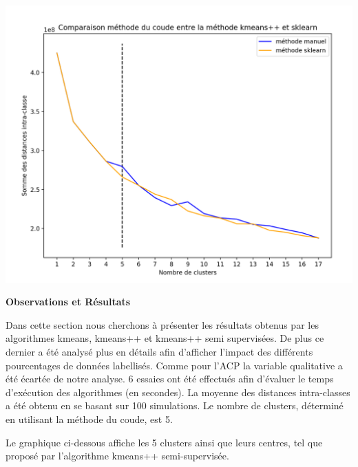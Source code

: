 \documentclass[ ]{article}
\begin{document}
\begin{center}
\includegraphics[scale=0.50]{Comparison_elbow2.png}
\end{center}

\vspace{5 mm}
\noindent
\begin{large}
\textbf{Observations et Résultats}
\end{large}

\noindent
Dans cette section nous cherchons à présenter les résultats obtenus par les algorithmes kmeans, kmeans++ et kmeans++ semi supervisées. De plus ce dernier a été analysé plus en détails afin d'afficher l'impact des différents pourcentages de données labellisés. Comme pour l'ACP la variable qualitative a été écartée de notre analyse.
6 essaies ont été effectués afin d'évaluer le temps d'exécution des algorithmes (en secondes). La moyenne des distances intra-classes a été obtenu en se basant sur 100 simulations. Le nombre de clusters, déterminé en utilisant la méthode du coude, est 5.

\noindent
Le graphique ci-dessous affiche les 5 clusters ainsi que leurs centres, tel que proposé par l'algorithme kmeans++ semi-supervisée.
\end{document}
